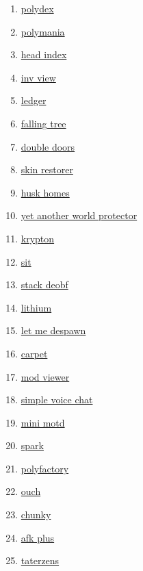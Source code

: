 \begin{enumerate}
    \item \href{https://github.com/Patbox/polydex}{polydex}
    \item \href{https://github.com/Patbox/polymania}{polymania}
    \item \href{https://github.com/PotatoPresident/HeadIndex}{head index}
    \item \href{https://github.com/PotatoPresident/InvView}{inv view}
    \item \href{https://github.com/QuiltServerTools/Ledger}{ledger}
    \item \href{https://github.com/RakambdaOrg/FallingTree}{falling tree}
    \item \href{https://github.com/Serilum/Double-Doors}{double doors}
    \item \href{https://github.com/Suiranoil/SkinRestorer}{skin restorer}
    \item \href{https://github.com/WiIIiam278/HuskHomes/}{husk homes}
    \item \href{https://github.com/Z0rdak/Yet-Another-World-Protector}{yet another world protector}
    \item \href{https://github.com/astei/krypton}{krypton}
    \item \href{https://github.com/bl4ckscor3/Sit}{sit}
    \item \href{https://github.com/booky10/StackDeobfuscator}{stack deobf}
    \item \href{https://github.com/caffeinemc/lithium-fabric}{lithium}
    \item \href{https://github.com/frikinjay/let-me-despawn}{let me despawn}
    \item \href{https://github.com/gnembon/fabric-carpet}{carpet}
    \item \href{https://github.com/haykam821/Mod-Viewer}{mod viewer}
    \item \href{https://github.com/henkelmax/simple-voice-chat}{simple voice chat}
    \item \href{https://github.com/jpenilla/MiniMOTD}{mini motd}
    \item \href{https://github.com/lucko/spark}{spark}
    \item \href{https://github.com/patbox/PolyFactory}{polyfactory}
    \item \href{https://github.com/patbox/ouch}{ouch}
    \item \href{https://github.com/pop4959/Chunky}{chunky}
    \item \href{https://github.com/sakura-ryoko/afkplus}{afk plus}
    \item \href{https://github.com/samolego/Taterzens/}{taterzens}
\end{enumerate}


